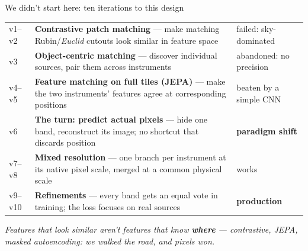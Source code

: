 \documentclass[aspectratio=169,10pt]{beamer}
\begin{document}
\begin{frame}{We didn't start here: ten iterations to this design}
  \small
  \begin{tabular}{@{}p{}p{}l@{}}
    \toprule
    v1--v2 & \textbf{Contrastive patch matching} --- make matching Rubin/\textit{Euclid} cutouts
             look similar in feature space & \textcolor{jaispaccent}{failed: sky-dominated} \\[0.35em]
    v3     & \textbf{Object-centric matching} --- discover individual sources, pair them across
             instruments & \textcolor{jaispaccent}{abandoned: no precision} \\[0.35em]
    v4--v5 & \textbf{Feature matching on full tiles (JEPA)} --- make the two instruments'
             features agree at corresponding positions & \textcolor{jaispaccent}{beaten by a simple CNN} \\[0.35em]
    v6     & \textbf{The turn: predict actual pixels} --- hide one band, reconstruct its image;
             no shortcut that discards position & \alert{\textbf{paradigm shift}} \\[0.35em]
    v7--v8 & \textbf{Mixed resolution} --- one branch per instrument at its native pixel scale,
             merged at a common physical scale & \textcolor{jaispteal}{works} \\[0.35em]
    v9--v10 & \textbf{Refinements} --- every band gets an equal vote in training; the loss
             focuses on real sources & \textcolor{jaispteal}{\textbf{production}} \\
    \bottomrule
  \end{tabular}
  \vfill
  \centering
  \emph{Features that look similar aren't features that know \textbf{where} ---
    contrastive, JEPA, masked autoencoding: we walked the road, and pixels won.}
\end{frame}
\end{document}
